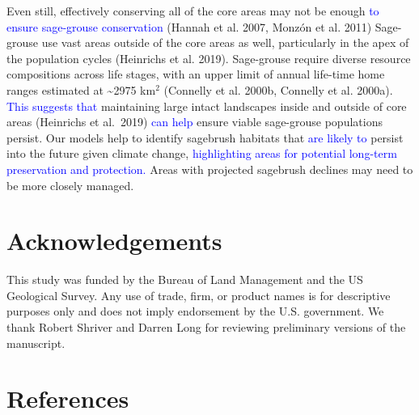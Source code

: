 \documentclass[
  12pt,
]{article}
\begin{document}
Even still, effectively conserving all of the core areas may not be enough \textcolor{blue}{to ensure sage-grouse conservation} (Hannah et al. 2007, Monzón et al. 2011)
Sage-grouse use vast areas outside of the core areas as well, particularly in the apex of the population cycles (Heinrichs et al. 2019).
Sage-grouse require diverse resource compositions across life stages, with an upper limit of annual life-time home ranges estimated at \textasciitilde2975 km\(^2\) (Connelly et al. 2000b, Connelly et al. 2000a).
\textcolor{blue}{This suggests that} maintaining large intact landscapes inside and outside of core areas (Heinrichs et al.~2019) \textcolor{blue}{can help} ensure viable sage-grouse populations persist.
Our models help to identify sagebrush habitats that \textcolor{blue}{are likely to} persist into the future given climate change, \textcolor{blue}{highlighting areas for potential long-term preservation and protection.}
Areas with projected sagebrush declines may need to be more closely managed.

\hypertarget{acknowledgements}{%
\section{Acknowledgements}\label{acknowledgements}}

This study was funded by the Bureau of Land Management and the US Geological Survey.
Any use of trade, firm, or product names is for descriptive purposes only and does not imply endorsement by the U.S. government.
We thank Robert Shriver and Darren Long for reviewing preliminary versions of the manuscript.

\hypertarget{references}{%
\section{References}\label{references}}

\setlength{\parindent}{-0.2in}
\setlength{\leftskip}{0.2in}
\setlength{\parskip}{8pt}

\noindent
\end{document}
